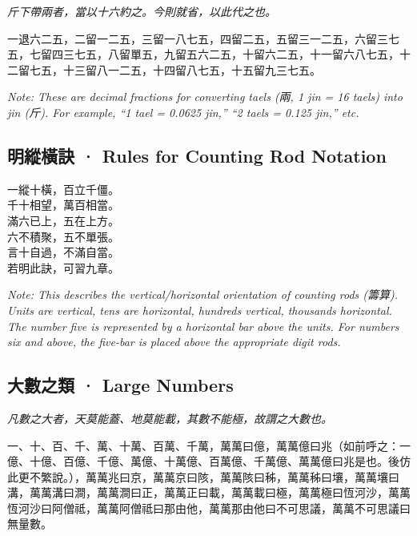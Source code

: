 \documentclass[11pt,a4paper]{article}
\newcommand{\cnote}[1]{\textcolor{notecolor}{\textit{#1}}}
\begin{document}
\textit{斤下帶兩者，當以十六約之。今則就省，以此代之也。}

\medskip

\noindent
一退六二五，二留一二五，三留一八七五，四留二五，五留三一二五，六留三七五，七留四三七五，八留單五，九留五六二五，十留六二五，十一留六八七五，十二留七五，十三留八一二五，十四留八七五，十五留九三七五。

\cnote{Note: These are decimal fractions for converting taels (兩, 1 jin = 16 taels)
into jin (斤). For example, ``1 tael = 0.0625 jin,'' ``2 taels = 0.125 jin,'' etc.}

\subsection{明縱橫訣 · Rules for Counting Rod Notation}

\noindent
一縱十橫，百立千僵。\\[2pt]
千十相望，萬百相當。\\[2pt]
滿六已上，五在上方。\\[2pt]
六不積聚，五不單張。\\[2pt]
言十自過，不滿自當。\\[2pt]
若明此訣，可習九章。

\cnote{Note: This describes the vertical/horizontal orientation of counting rods
(籌算). Units are vertical, tens are horizontal, hundreds vertical, thousands
horizontal. The number five is represented by a horizontal bar above the units.
For numbers six and above, the five-bar is placed above the appropriate digit rods.}

\subsection{大數之類 · Large Numbers}

\textit{凡數之大者，天莫能蓋、地莫能載，其數不能極，故謂之大數也。}

\medskip

\noindent
一、十、百、千、萬、十萬、百萬、千萬，萬萬曰億，萬萬億曰兆（如前呼之：一億、十億、百億、千億、萬億、十萬億、百萬億、千萬億、萬萬億曰兆是也。後仿此更不繁說。），萬萬兆曰京，萬萬京曰陔，萬萬陔曰秭，萬萬秭曰壤，萬萬壤曰溝，萬萬溝曰澗，萬萬澗曰正，萬萬正曰載，萬萬載曰極，萬萬極曰恆河沙，萬萬恆河沙曰阿僧祗，萬萬阿僧祗曰那由他，萬萬那由他曰不可思議，萬萬不可思議曰無量數。
\end{document}

